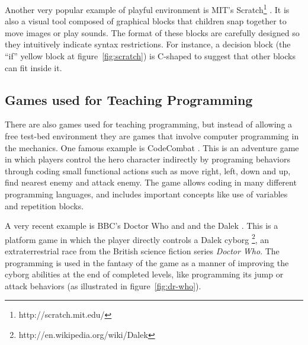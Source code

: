 \documentclass{sigchi}
\begin{document}
		Another very popular example of playful environment is MIT's Scratch\footnote{http://scratch.mit.edu/} \cite{Resnick2009}. It is also a visual tool composed of graphical blocks that children snap together to move images or play sounds. The format of these blocks are carefully designed so they intuitively indicate syntax restrictions. For instance, a decision block (the ``if'' yellow block at figure~\ref{fig:scratch}) is C-shaped to suggest that other blocks can fit inside it.

	\subsection{Games used for Teaching Programming}
		There are also games used for teaching programming, but instead of allowing a free test-bed environment they are games that involve computer programming in the mechanics. One famous example is CodeCombat \cite{Saines2013}. This is an adventure game in which players control the hero character indirectly by programing behaviors through coding small functional actions such as move right, left, down and up, find nearest enemy and attack enemy. The game allows coding in many different programming languages, and includes important concepts like use of variables and repetition blocks.
	
		A very recent example is BBC's Doctor Who and and the Dalek \cite{BBC2014}. This is a platform game in which the player directly controls a Dalek cyborg \footnote{http://en.wikipedia.org/wiki/Dalek}, an extraterrestrial race from the British science fiction series \textit{Doctor Who}. The programming is used in the fantasy of the game as a manner of improving the cyborg abilities at the end of completed levels, like programming its jump or attack behaviors (as illustrated in figure~\ref{fig:dr-who}).
\end{document}
